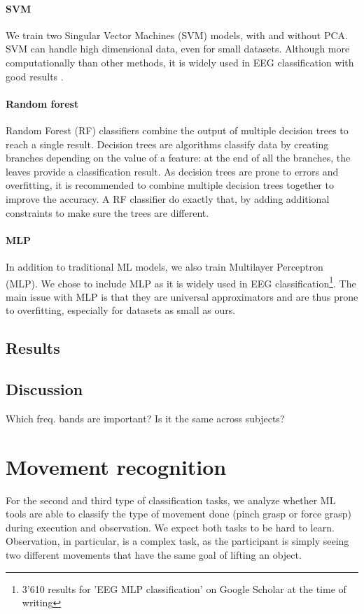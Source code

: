 \documentclass[10pt,conference,compsocconf]{IEEEtran}
\begin{document}
\paragraph{SVM}
We train two Singular Vector Machines (SVM) models, with and without PCA. SVM can handle high dimensional data, even for small datasets. Although more computationally than other methods, it is widely used in EEG classification with good results \cite{knn_svm_review}.

\paragraph{Random forest}
Random Forest (RF) classifiers combine the output of multiple decision trees to reach a single result. Decision trees are algorithms classify data by creating branches depending on the value of a feature: at the end of all the branches, the leaves provide a classification result. As decision trees are prone to errors and overfitting, it is recommended to combine multiple decision trees together to improve the accuracy. A RF classifier do exactly that, by adding additional constraints to make sure the trees are different.

\paragraph{MLP}
In addition to traditional ML models, we also train Multilayer Perceptron (MLP). We chose to include MLP as it is widely used in EEG classification\footnote{3'610 results for 'EEG MLP classification' on Google Scholar at the time of writing}. The main issue with MLP is that they are universal approximators and are thus prone to overfitting, especially for datasets as small as ours.

\subsection{Results}
\subsection{Discussion}
Which freq. bands are important? Is it the same across subjects?

\section{Movement recognition}
\label{sec:objectrecognition}
For the second and third type of classification tasks, we analyze whether ML tools are able to classify the type of movement done (pinch grasp or force grasp) during execution and observation. We expect both tasks to be hard to learn. Observation, in particular, is a complex task, as the participant is simply seeing two different movements that have the same goal of lifting an object.
\end{document}
